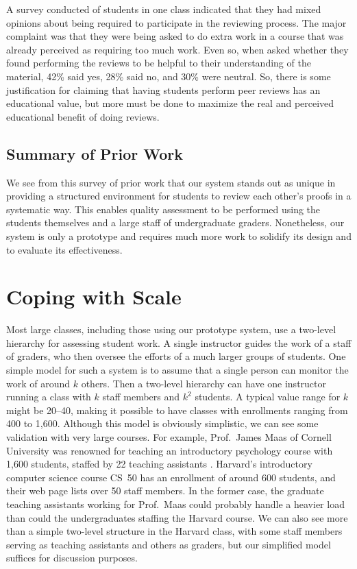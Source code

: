 \documentclass[12pt]{article}
\begin{document}
A survey conducted of students in one class indicated that they had
mixed opinions about being required to participate in the reviewing
process.  The major complaint was that they were being asked to do
extra work in a course that was already perceived as requiring too much
work.  Even so, when asked whether they found performing the reviews
to be helpful to their understanding of the material, 42\% said yes,
28\% said no, and 30\% were neutral.  So, there is some justification
for claiming that having students perform peer reviews has an educational
value, but more must be done to maximize the real and perceived
educational benefit of doing reviews.

\subsection{Summary of Prior Work}

We see from this survey of prior work that our system stands out as
unique in providing a structured environment for students to review
each other's proofs in a systematic way.  This enables quality
assessment to be performed using the students themselves and a large
staff of undergraduate graders.  Nonetheless, our system is only a
prototype and requires much more work to solidify its design and to
evaluate its effectiveness.

\section{Coping with Scale}

Most large classes, including those using our prototype system, use a
two-level hierarchy for assessing student work.  A single instructor
guides the work of a staff of graders, who then oversee the efforts of
a much larger groups of students.  One simple model for such a system
is to assume that a single person can monitor the work of around $k$
others.  Then a two-level hierarchy can have one instructor running a
class with $k$ staff members and $k^2$ students.  A typical value
range for $k$ might be 20--40, making it possible to have classes with
enrollments ranging from 400 to 1,600.  Although this model is
obviously simplistic, we can see some validation with very large
courses.  For example, Prof.~James Maas of Cornell University was
renowned for teaching an introductory psychology course with 1,600
students, staffed by 22 teaching assistants \citep{arenson-nyt00}.
Harvard's introductory computer science course CS~50 has an enrollment
of around 600 students, and their web page lists over 50 staff
members.  In the former case, the graduate teaching assistants working
for Prof.~Maas could probably handle a heavier load than could the
undergraduates staffing the Harvard course.  We can also see more than
a simple two-level structure in the Harvard class, with some staff members
serving as teaching assistants and others as graders, but our
simplified model suffices for discussion purposes.
\end{document}
